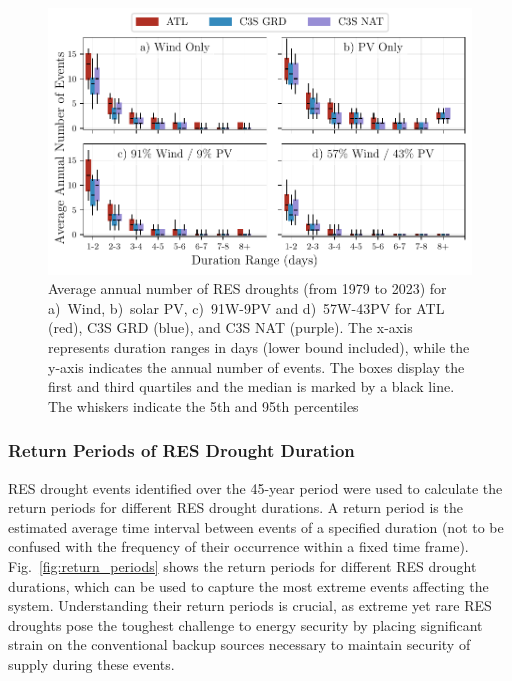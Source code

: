 \documentclass[preprint, 12pt]{elsarticle}
\begin{document}
\begin{figure}[!ht]
	\centering
	\includegraphics[width=\textwidth]{droughts_number_events.pdf}
	\caption{Average annual number of RES droughts (from 1979 to 2023) for a)~Wind, b)~solar PV, c)~91W-9PV and d)~57W-43PV for ATL (red), C3S GRD (blue), and C3S NAT (purple). The x-axis represents duration ranges in days (lower bound included), while the y-axis indicates the annual number of events. The boxes display the first and third quartiles and the median is marked by a black line. The whiskers indicate the 5th and 95th percentiles}
	\label{fig:boxplot_number_events}	
\end{figure}

\subsubsection{Return Periods of RES Drought Duration}

RES drought events identified over the 45-year period were used to calculate the return periods for different RES drought durations. A return period is the estimated average time interval between events of a specified duration (not to be confused with the frequency of their occurrence within a fixed time frame). Fig.~\ref{fig:return_periods} shows the return periods for different RES drought durations, which can be used to capture the most extreme events affecting the system. Understanding their return periods is crucial, as extreme yet rare RES droughts pose the toughest challenge to energy security by placing significant strain on the conventional backup sources necessary to maintain security of supply during these events.
\end{document}
